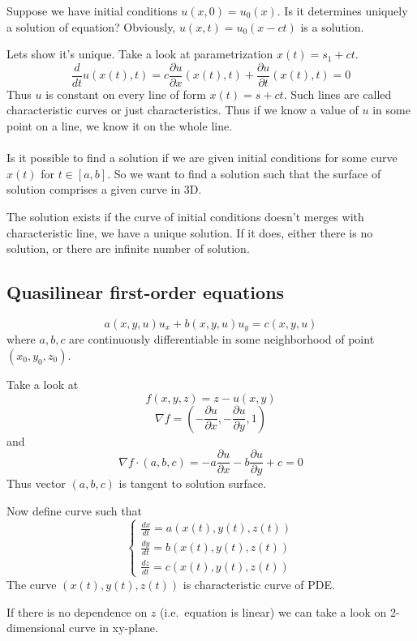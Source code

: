 Suppose we have initial conditions $u(x,0)= u_0(x)$. Is it determines uniquely a solution of equation? Obviously, $u(x,t) = u_0(x-ct)$ is a solution.

Lets show it's unique. Take a look at parametrization $x(t) = s_1 + ct$.
$$\frac{d}{dt} u(x(t),t) = c\frac{\partial u}{\partial x}(x(t),t) + \frac{\partial u}{\partial t}(x(t),t) = 0$$ 
Thus $u$ is constant on every line of form $x(t)=s+ct$. Such lines are called characteristic curves or just characteristics. Thus if we know a value of $u$ in some point on a line, we know it on the whole line.

\paragraph{} Is it possible to find a solution if we are given initial conditions for some curve $x(t)$ for $t \in [a,b]$. So we want to find a solution such that the surface of solution comprises a given curve in 3D.

The solution exists if the curve of initial conditions doesn't merges with characteristic line, we have a unique solution. If it does, either there is no solution, or there are infinite number of solution.

\subsection{Quasilinear first-order equations}
$$a(x,y,u)u_x + b(x,y,u)u_y = c(x,y,u)$$
where $a,b,c$ are continuously differentiable in some neighborhood of point $(x_0,y_0,z_0)$.

Take a look at
$$f(x,y,z) = z - u(x,y)$$
$$\nabla f = \left(-\frac{\partial u}{\partial x},-\frac{\partial u}{\partial y},1\right)$$
and
$$\nabla f \cdot (a,b,c) = -a\frac{\partial u}{\partial x} -b\frac{\partial u}{\partial y}+c  = 0$$
Thus vector $(a,b,c) $ is tangent to solution surface.

Now define curve such that
$$\begin{cases}
\frac{dx}{dt} = a(x(t), y(t), z(t))\\
\frac{dy}{dt} = b(x(t), y(t), z(t))\\
\frac{dz}{dt} = c(x(t), y(t), z(t))
\end{cases}$$
The curve $\left(x(t), y(t), z(t)\right)$ is characteristic curve of PDE.

If there is no dependence on $z$ (i.e.\ equation is linear) we can take a look on 2-dimensional curve in xy-plane.

